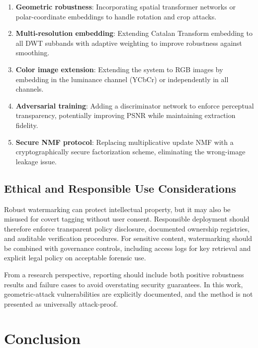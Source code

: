 \documentclass[journal]{IEEEtran}
\begin{document}
\begin{enumerate}
  \item \textbf{Geometric robustness}: Incorporating spatial transformer
  networks or polar-coordinate embeddings to handle rotation and crop
  attacks.
  \item \textbf{Multi-resolution embedding}: Extending Catalan Transform
  embedding to all DWT subbands with adaptive weighting to improve
  robustness against smoothing.
  \item \textbf{Color image extension}: Extending the system to RGB
  images by embedding in the luminance channel (YCbCr) or
  independently in all channels.
  \item \textbf{Adversarial training}: Adding a discriminator network
  to enforce perceptual transparency, potentially improving PSNR
  while maintaining extraction fidelity.
  \item \textbf{Secure NMF protocol}: Replacing multiplicative update
  NMF with a cryptographically secure factorization scheme,
  eliminating the wrong-image leakage issue.
\end{enumerate}

\subsection{Ethical and Responsible Use Considerations}

Robust watermarking can protect intellectual property, but it may also be
misused for covert tagging without user consent. Responsible deployment should
therefore enforce transparent policy disclosure, documented ownership
registries, and auditable verification procedures. For sensitive content,
watermarking should be combined with governance controls, including access logs
for key retrieval and explicit legal policy on acceptable forensic use.

From a research perspective, reporting should include both positive robustness
results and failure cases to avoid overstating security guarantees. In this
work, geometric-attack vulnerabilities are explicitly documented, and the method
is not presented as universally attack-proof.

\section{Conclusion}
\end{document}
